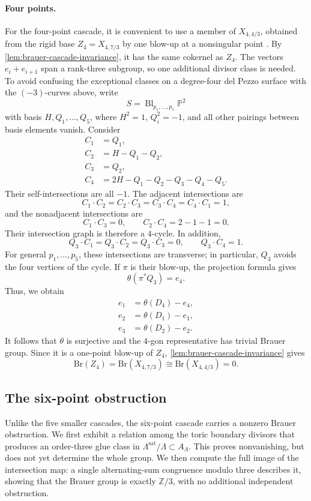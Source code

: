\documentclass[11pt]{article}
\theoremstyle{plain}
\theoremstyle{definition}
\theoremstyle{remark}
\newcommand{\Pp}{\mathbb P}
\newcommand{\Z}{\mathbb Z}
\newcommand{\Bl}{\operatorname{Bl}}
\newcommand{\Br}{\mathrm{Br}}
\begin{document}
\paragraph{Four points.}
For the four-point cascade, it is convenient to use a member of \(X_{4,4/3}\), obtained from the
rigid base \(Z_4=X_{4,7/3}\) by one blow-up at a nonsingular point
\cite[Corollary~8]{Corti2016}. By \cref{lem:brauer-cascade-invariance},
it has the same cokernel as \(Z_4\). The vectors \(e_i+e_{i+1}\) span a
rank-three subgroup, so one additional divisor class is needed. To avoid
confusing the exceptional classes on a degree-four del Pezzo surface with the
\((-3)\)-curves above, write
\[
S=\Bl_{p_1,\dots,p_5}\Pp^2
\]
with basis \(H,Q_1,\dots,Q_5\), where \(H^2=1\), \(Q_i^2=-1\), and all
other pairings between basis elements vanish. Consider
\[
\begin{aligned}
C_1&=Q_1,\\
C_2&=H-Q_1-Q_2,\\
C_3&=Q_2,\\
C_4&=2H-Q_1-Q_2-Q_3-Q_4-Q_5.
\end{aligned}
\]
Their self-intersections are all \(-1\). The adjacent intersections are
\[
C_1\cdot C_2=C_2\cdot C_3=C_3\cdot C_4=C_4\cdot C_1=1,
\]
and the nonadjacent intersections are
\[
C_1\cdot C_3=0,
\qquad
C_2\cdot C_4
=
2-1-1
=0.
\]
Their intersection graph is therefore a \(4\)-cycle. In addition,
\[
Q_3\cdot C_1=Q_3\cdot C_2=Q_3\cdot C_3=0,
\qquad
Q_3\cdot C_4=1.
\]
For general \(p_1,\dots,p_5\), these intersections are transverse; in
particular, \(Q_3\) avoids the four vertices of the cycle. If \(\pi\) is their
blow-up, the projection formula gives
\[
\theta(\pi^*Q_3)=e_4.
\]
Thus, we obtain
\[
\begin{aligned}
e_1&=\theta(D_4)-e_4,\\
e_2&=\theta(D_1)-e_1,\\
e_3&=\theta(D_2)-e_2.
\end{aligned}
\]
It follows that \(\theta\) is surjective and the \(4\)-gon representative
has trivial Brauer group. Since it is a one-point blow-up of \(Z_4\),
\cref{lem:brauer-cascade-invariance} gives
\[
\Br(Z_4)=\Br(X_{4,7/3})\cong\Br(X_{4,4/3})=0.
\]

\subsection{The six-point obstruction}
\label{app:brauer-six}

Unlike the five smaller cascades, the six-point cascade carries a
nonzero Brauer obstruction. We first exhibit a relation among the toric
boundary divisors that produces an order-three glue class in
\(\Lambda^{\mathrm{sat}}/\Lambda\subset A_\Lambda\). This proves
nonvanishing, but does not yet determine the whole group. We then compute
the full image of the intersection map: a single alternating-sum
congruence modulo three describes it, showing that the Brauer group is
exactly \(\Z/3\), with no additional independent obstruction.
\end{document}
